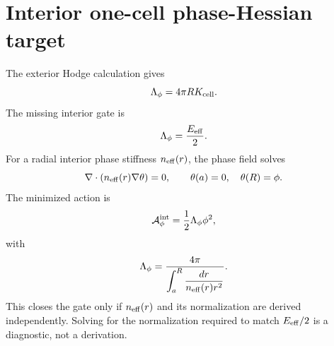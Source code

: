 \section{Interior one-cell phase-Hessian target}
The exterior Hodge calculation gives
\[
  \Lambda_\phi=4\pi R K_{\rm cell}.
\]
The missing interior gate is
\[
  \Lambda_\phi=\frac{E_{\rm eff}}{2}.
\]
For a radial interior phase stiffness \(n_{\rm eff}(r)\), the phase field solves
\[
  \nabla\cdot(n_{\rm eff}(r)\nabla\theta)=0,
  \qquad
  \theta(a)=0,\quad \theta(R)=\phi.
\]
The minimized action is
\[
  \mathcal A_\phi^{\rm int}
  =
  \frac12\Lambda_\phi\phi^2,
\]
with
\[
  \Lambda_\phi
  =
  \frac{4\pi}
       {\displaystyle\int_a^R\frac{dr}{n_{\rm eff}(r)r^2}}.
\]
This closes the gate only if \(n_{\rm eff}(r)\) and its normalization are
derived independently.  Solving for the normalization required to match
\(E_{\rm eff}/2\) is a diagnostic, not a derivation.
